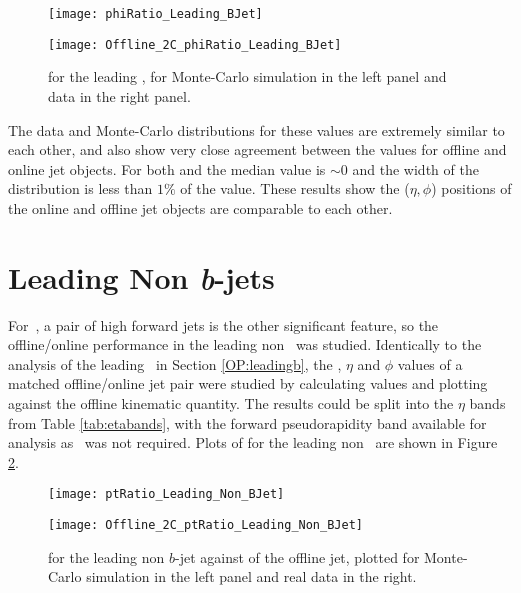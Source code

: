 		\begin{figure}[h]
			\centering
			\begin{minipage}[h]{0.48\linewidth}
				\texttt{[image: phiRatio\_Leading\_BJet]}

			\end{minipage}
			\quad
			\begin{minipage}[h]{0.48\linewidth}
				\texttt{[image: Offline\_2C\_phiRatio\_Leading\_BJet]}
			\end{minipage}
			\caption{\dphph for the leading \bjet, for Monte-Carlo simulation in the left panel and data in the right panel.}
			\label{fig:O:leadingbphi}
		\end{figure}

		\newpage
		The data and Monte-Carlo distributions for these values are extremely similar to each other, and also show very close agreement between the values for offline and online jet objects. For both \dee and \dphph the median value is $\sim0$ and the width of the distribution is less than $1\%$ of the value. These results show the ($\eta, \phi$) positions of the online and offline jet objects are comparable to each other.


\newpage
\section{Leading Non \textit{b}-jets}
	\label{OP:leadingnonb}

	For \VBFHBB\,, a pair of high \pt forward jets is the other significant feature, so the offline/online performance in the leading non \bjet\ was studied. Identically to the analysis of the leading \bjet\ in Section \ref{OP:leadingb}, the \pt, $\eta$ and $\phi$ values of a matched offline/online jet pair were studied by calculating \dxx values and plotting against the offline kinematic quantity. The results could be split into the $\eta$ bands from Table \ref{tab:etabands}, with the forward pseudorapidity band available for analysis as \btag\ was not required. Plots of \dptpt for the leading non \bjet\ are shown in Figure \ref{fig:O:leadingnonbpt}.

	\begin{figure}[h]
		\centering
		\begin{minipage}[h]{0.48\linewidth}
			\texttt{[image: ptRatio\_Leading\_Non\_BJet]}

		\end{minipage}
		\quad
		\begin{minipage}[h]{0.48\linewidth}
			\texttt{[image: Offline\_2C\_ptRatio\_Leading\_Non\_BJet]}
		\end{minipage}
		\caption{\dptpt for the leading \pt non $b$-jet against \pt of the offline jet, plotted for Monte-Carlo simulation in the left panel and real data in the right.}
		\label{fig:O:leadingnonbpt}
	\end{figure}

